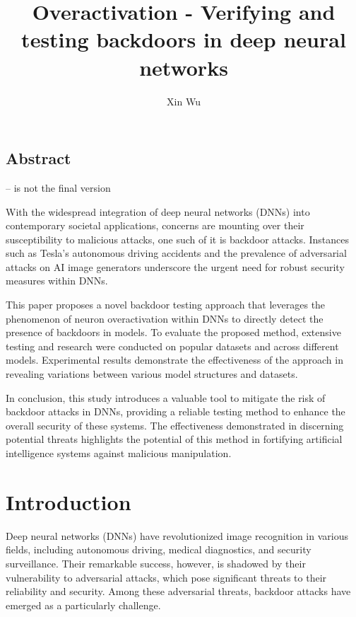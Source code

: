 \documentclass[12pt]{report}
\title{Overactivation - Verifying and testing backdoors in deep neural networks}
\author{Xin Wu}
\begin{document}
\maketitle

\section*{Abstract}
-- is not the final version

    With the widespread integration of deep neural networks (DNNs) into contemporary societal 
    applications, concerns are mounting over their susceptibility to malicious attacks, one such of it is 
    backdoor attacks. Instances such as Tesla's autonomous driving accidents and the prevalence of 
    adversarial attacks on AI image generators underscore the urgent need for robust security measures 
    within DNNs.

    This paper proposes a novel backdoor testing approach that leverages the phenomenon of neuron 
    overactivation within DNNs to directly detect the presence of backdoors in models. To evaluate 
    the proposed method, extensive testing and research were conducted on popular datasets and across 
    different models. Experimental results demonstrate the effectiveness of the approach in revealing 
    variations between various model structures and datasets.

    In conclusion, this study introduces a valuable tool to mitigate the risk of backdoor attacks in 
    DNNs, providing a reliable testing method to enhance the overall security of these systems. The 
    effectiveness demonstrated in discerning potential threats highlights the potential of this method 
    in fortifying artificial intelligence systems against malicious manipulation.

\tableofcontents{}

\chapter{Introduction}
    Deep neural networks (DNNs) have revolutionized image recognition in various fields,
    including autonomous driving\cite{A1}, medical diagnostics\cite{B1}, and security surveillance\cite{A2}. Their 
    remarkable success, however, is shadowed by their vulnerability to adversarial attacks, 
    which pose significant threats to their reliability and security. Among these adversarial 
    threats, backdoor attacks have emerged as a particularly challenge.
\end{document}
